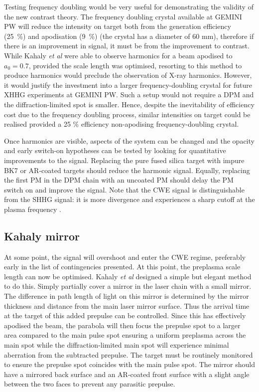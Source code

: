 Testing frequency doubling would be very useful for demonstrating the validity of the new contrast theory. The frequency doubling crystal available at GEMINI PW will reduce the intensity on target both from the generation efficiency (\qty{25}{\%}) and apodisation (\qty{9}{\%}) (the crystal has a diameter of 60 mm), therefore if there is an improvement in signal, it must be from the improvement to contrast. While Kahaly \textit{et al} were able to observe harmonics for a beam apodised to $a_0 = 0.7$, provided the scale length was optimised, resorting to this method to produce harmonics would preclude the observation of X-ray harmonics. However, it would justify the investment into a larger frequency-doubling crystal for future XHHG experiments at GEMINI PW. Such a setup would not require a DPM and the diffraction-limited spot is smaller. Hence, despite the inevitability of efficiency cost due to the frequency doubling process, similar intensities on target could be realised provided a 25 \% efficiency non-apodising frequency-doubling crystal.

Once harmonics are visible, aspects of the system can be changed and the opacity and early switch-on hypotheses can be tested by looking for quantitative improvements to the signal. Replacing the pure fused silica target with impure BK7 or AR-coated targets should reduce the harmonic signal. Equally, replacing the first PM in the DPM chain with an uncoated PM should delay the PM switch on and improve the signal. Note that the CWE signal is distinguishable from the SHHG signal: it is more divergence and experiences a sharp cutoff at the plasma frequency \cite{kahalyDirectObservationDensityGradient2013}.

\subsection{Kahaly mirror}
At some point, the signal will overshoot and enter the CWE regime, preferably early in the list of contingencies presented. At this point, the preplasma scale length can now be optimised. Kahaly \textit{et al} \cite{kahalyDirectObservationDensityGradient2013} designed a simple but elegant method to do this. Simply partially cover a mirror in the laser chain with a small mirror. The difference in path length of light on this mirror is determined by the mirror thickness and distance from the main laser mirror surface. Thus the arrival time at the target of this added prepulse can be controlled. Since this has effectively apodised the beam, the parabola will then focus the prepulse spot to a larger area compared to the main pulse spot ensuring a uniform preplasma across the main spot while the diffraction-limited main spot will experience minimal aberration from the subtracted prepulse. The target must be routinely monitored to ensure the prepulse spot coincides with the main pulse spot. The mirror should have a mirrored back surface and an AR-coated front surface with a slight angle between the two faces to prevent any parasitic prepulse.

